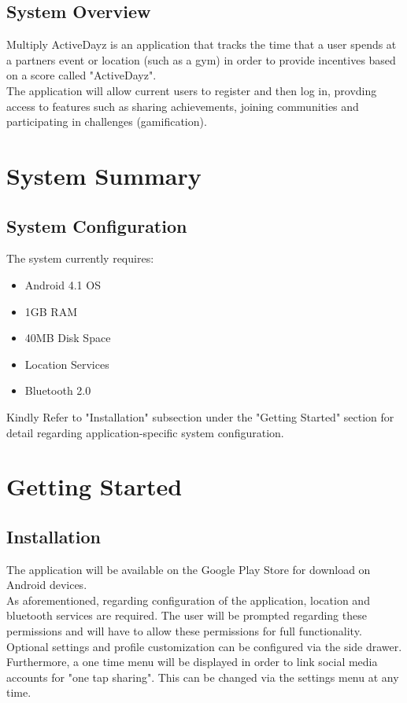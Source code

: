 \documentclass[11pt]{article}
\begin{document}
\subsection{System Overview}
Multiply ActiveDayz is an application that tracks the time that a user spends at a partners event or location
(such as a gym) in order to provide incentives based on a score called "ActiveDayz".\\
The application will allow current users to register and then log in, provding access to features such as sharing
achievements, joining communities and participating in challenges (gamification).\\

\newpage
\section{System Summary}
\subsection{System Configuration}
The system currently requires:\\
\begin{itemize}
	\item Android 4.1 OS
	\item 1GB RAM
	\item 40MB Disk Space		
	\item Location Services
	\item Bluetooth 2.0
\end{itemize}
Kindly Refer to "Installation" subsection under the "Getting Started" section for detail regarding
application-specific system configuration.\\

\newpage
\section{Getting Started}

\subsection{Installation}
The application will be available on the Google Play Store for download on Android devices.\\
As aforementioned, regarding configuration of the application, location and bluetooth services are required.
The user will be prompted regarding these permissions and will have to allow these permissions for full functionality.\\
Optional settings and profile customization can be configured via the side drawer.\\
Furthermore, a one time menu will be displayed in order to link social media accounts for "one tap sharing".
This can be changed via the settings menu at any time.\\
\end{document}
